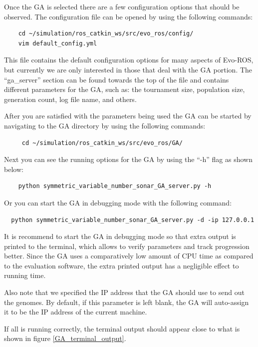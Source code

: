 \documentclass{report}
\begin{document}
Once the GA is selected there are a few configuration options that should be observed. The configuration file can be opened by using the following commands:
\begin{lstlisting}
	cd ~/simulation/ros_catkin_ws/src/evo_ros/config/
	vim default_config.yml  
\end{lstlisting}

This file contains the default configuration options for many aspects of Evo-ROS, but currently we are only interested in those that deal with the GA portion. The ``ga\_server'' section can be found towards the top of the file and contains different parameters for the GA, such as: the tournament size, population size, generation count, log file name, and others.

After you are satisfied with the parameters being used the GA can be started by navigating to the GA directory by using the following commands:
 \begin{lstlisting}
	 cd ~/simulation/ros_catkin_ws/src/evo_ros/GA/
 \end{lstlisting}
 
Next you can see the running options for the GA by using the ``-h'' flag as shown below:
 \begin{lstlisting}
	python symmetric_variable_number_sonar_GA_server.py -h
 \end{lstlisting}
 
 Or you can start the GA in debugging mode with the following command:
\begin{lstlisting}
  python symmetric_variable_number_sonar_GA_server.py -d -ip 127.0.0.1
\end{lstlisting}
  
 It is recommend to start the GA in debugging mode so that extra output is printed to the terminal, which allows to verify parameters and track progression better. Since the GA uses a comparatively low amount of CPU time as compared to the evaluation software, the extra printed output has a negligible effect to running time.
 
 Also note that we specified the IP address that the GA should use to send out the genomes. By default, if this parameter is left blank, the GA will auto-assign it to be the IP address of the current machine.
 
 If all is running correctly, the terminal output should appear close to what is shown in figure \ref{GA_terminal_output}.
 
\end{document}
